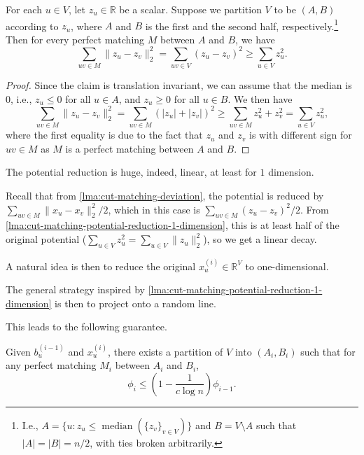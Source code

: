 \begin{lemma}\label{lma:cut-matching-potential-reduction-1-dimension}
	For each \(u \in V\), let \(z_u \in \mathbb{R} \) be a scalar. Suppose we partition \(V\) to be \((A, B)\) according to \(z_u\), where \(A\) and \(B\) is the first and the second half, respectively.\footnote{I.e., \(A = \{ u \colon z_u \leq \operatorname{median}(\{ z_v\} _{v \in V}) \} \) and \(B = V \setminus A\) such that \(\lvert A \rvert = \lvert B \rvert = n / 2\), with ties broken arbitrarily.} Then for every perfect matching \(M\) between \(A\) and \(B\), we have
	\[
		\sum_{uv \in M} \lVert z_u - z_v \rVert _2^2
		= \sum_{uv \in V} (z_u - z_v)^2
		\geq \sum_{u \in V} z_u^2.
	\]
\end{lemma}
\begin{proof}
	Since the claim is translation invariant, we can assume that the median is \(0\), i.e., \(z_u \leq 0\) for all \(u \in A\), and \(z_u \geq 0\) for all \(u \in B\). We then have
	\[
		\sum_{uv \in M} \lVert z_u - z_v \rVert _2^2
		= \sum_{uv \in M} (\lvert z_u \rvert + \lvert z_v \rvert )^2
		\geq \sum_{uv \in M} z_u^2 + z_v^2
		= \sum_{u \in V} z_u^2,
	\]
	where the first equality is due to the fact that \(z_u\) and \(z_v\) is with different sign for \(uv \in M\) as \(M\) is a perfect matching between \(A\) and \(B\).
\end{proof}

\begin{remark}
	The potential reduction is huge, indeed, linear, at least for \(1\) dimension.
\end{remark}
\begin{explanation}
	Recall that from \autoref{lma:cut-matching-deviation}, the potential is reduced by \(\sum_{uv \in M} \lVert x_u - x_v \rVert _2^2 / 2\), which in this case is \(\sum_{uv \in M} (z_u - z_v)^2 / 2\). From \autoref{lma:cut-matching-potential-reduction-1-dimension}, this is at least half of the original potential (\(\sum_{u \in V} z_u^2 = \sum_{u \in V} \lVert z_u \rVert _2^2\)), so we get a linear decay.
\end{explanation}

A natural idea is then to reduce the original \(x_u^{(i)} \in \mathbb{R} ^{V}\) to one-dimensional.

\begin{intuition}
	The general strategy inspired by \autoref{lma:cut-matching-potential-reduction-1-dimension} is then to project onto a random line.
\end{intuition}

This leads to the following guarantee.

\begin{lemma}\label{lma:cut-matching-potential-reduction}
	Given \(b_u^{(i-1)}\) and \(x_u^{(i)}\), there exists a partition of \(V\) into \((A_i, B_i)\) such that for any perfect matching \(M_i\) between \(A_i\) and \(B_i\),
	\[
		\phi _i
		\leq \left( 1 - \frac{1}{c \log n} \right) \phi _{i-1}.
	\]
\end{lemma}